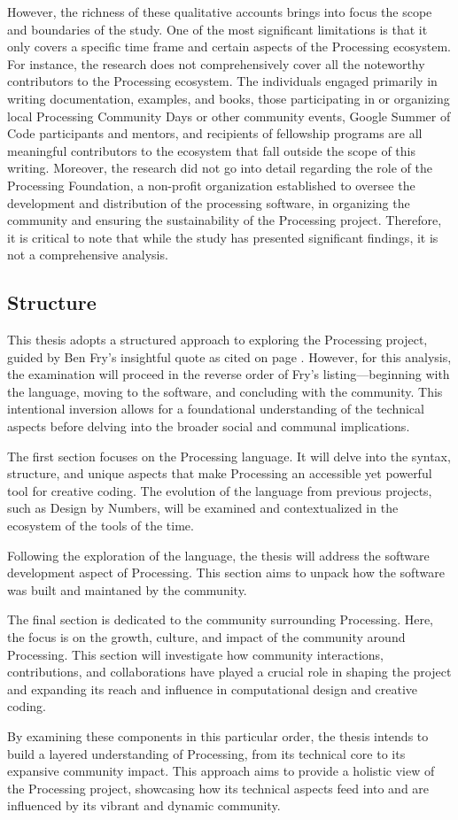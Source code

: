 However, the richness of these qualitative accounts brings into focus the scope and boundaries of the study. One of the most significant limitations is that it only covers a specific time frame and certain aspects of the Processing ecosystem. For instance, the research does not comprehensively cover all the noteworthy contributors to the Processing ecosystem. The individuals engaged primarily in writing documentation, examples, and books, those participating in or organizing local Processing Community Days or other community events, Google Summer of Code participants and mentors, and recipients of fellowship programs are all meaningful contributors to the ecosystem that fall outside the scope of this writing. Moreover, the research did not go into detail regarding the role of the Processing Foundation, a non-profit organization established to oversee the development and distribution of the processing software, in organizing the community and ensuring the sustainability of the Processing project. Therefore, it is critical to note that while the study has presented significant findings, it is not a comprehensive analysis.

\subsection{Structure}
This thesis adopts a structured approach to exploring the Processing project, guided by Ben Fry’s insightful quote as cited on page \pageref{fry_quote}. However, for this analysis, the examination will proceed in the reverse order of Fry’s listing—beginning with the language, moving to the software, and concluding with the community. This intentional inversion allows for a foundational understanding of the technical aspects before delving into the broader social and communal implications.

The first section focuses on the Processing language. It will delve into the syntax, structure, and unique aspects that make Processing an accessible yet powerful tool for creative coding. The evolution of the language from previous projects, such as Design by Numbers, will be examined and contextualized in the ecosystem of the tools of the time. 

Following the exploration of the language, the thesis will address the software development aspect of Processing. This section aims to unpack how the software was built and maintaned by the community.

The final section is dedicated to the community surrounding Processing. Here, the focus is on the growth, culture, and impact of the community around Processing. This section will investigate how community interactions, contributions, and collaborations have played a crucial role in shaping the project and expanding its reach and influence in computational design and creative coding.

By examining these components in this particular order, the thesis intends to build a layered understanding of Processing, from its technical core to its expansive community impact. This approach aims to provide a holistic view of the Processing project, showcasing how its technical aspects feed into and are influenced by its vibrant and dynamic community.